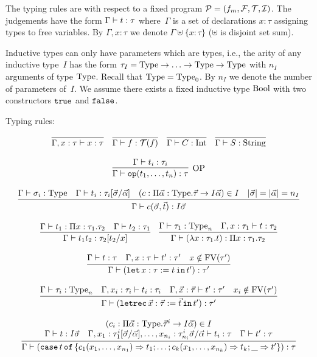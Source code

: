 \documentclass[final]{msc}
\begin{document}
The typing rules are with respect to a fixed \JuvixCore{} program $\mathcal{P} = (f_m, \mathcal{F}, \mathcal{T}, \mathcal{I})$. The judgements have the form $\Gamma \vdash t : \tau$ where~$\Gamma$ is a set of declarations $x : \tau$ assigning types to free variables. By $\Gamma, x : \tau$ we denote $\Gamma \uplus \{x : \tau\}$ ($\uplus$ is disjoint set sum).

Inductive types can only have parameters which are types, i.e., the arity of any inductive type~$I$ has the form $\tau_I = \mathrm{Type} \to \ldots \to \mathrm{Type} \to \mathrm{Type}$ with $n_I$ arguments of type $\mathrm{Type}$. Recall that $\mathrm{Type} = \mathrm{Type}_0$. By $n_I$ we denote the number of parameters of~$I$. We assume there exists a fixed inductive type $\mathrm{Bool}$ with two constructors $\mathtt{true}$ and $\mathtt{false}$.

Typing rules:

\[
\begin{array}{c}
\infer{\Gamma, x : \tau \proves x : \tau}{}\quad
\infer{\Gamma \proves f : \Tc(f)}{}\quad
\infer{\Gamma \proves C : \Int}{}\quad
\infer{\Gamma \proves S : \String}{}
\\ \\
\infer[\mathrm{OP}]{\Gamma \proves \op(t_1,\ldots,t_n) : \tau}{\Gamma \proves t_i : \tau_i}
\\ \\
\infer{\Gamma \proves c(\vec{\sigma},\vec{t}) : I \vec{\sigma}}{\Gamma \proves \sigma_i : \Type & \Gamma \proves t_i : \tau_i[\vec{\sigma}/\vec{\alpha}] & (c : \Pi \vec{\alpha} : \Type . \vec{\tau} \to I \vec{\alpha}) \in I & |\vec{\sigma}| = |\vec{\alpha}| = n_I}
\\ \\
\infer{\Gamma \proves t_1 t_2 : \tau_2[t_2/x]}{\Gamma \proves t_1 : \Pi x : \tau_1 . \tau_2 & \Gamma \proves t_2 : \tau_1}\quad
\infer{\Gamma \proves (\lambda x : \tau_1 . t) : \Pi x : \tau_1 . \tau_2}{\Gamma \proves \tau_1 : \Type_n & \Gamma, x : \tau_1 \proves t : \tau_2}
\\ \\
\infer{\Gamma \proves (\slet{x : \tau := t}{t'}) : \tau'}{\Gamma \proves t : \tau & \Gamma, x : \tau \proves t' : \tau' & x \notin \FV(\tau')}
\\ \\
\infer{\Gamma \proves (\sletrec{\vec{x} : \vec{\tau} := \vec{t}}{t'}) : \tau'}{\Gamma \proves \tau_i : \Type_n & \Gamma, x_i : \tau_i \proves t_i : \tau_i & \Gamma, \vec{x} : \vec{\tau} \proves t' : \tau' & x_i \notin \FV(\tau')}
\\ \\
\infer{\Gamma \proves (\scase{t}{\{c_1(x_1,\ldots,x_{n_1}) \To t_1; \ldots; c_k(x_1,\ldots,x_{n_k}) \To t_k; \_ \To t'\}}) : \tau}{\multicolumn{3}{c}{(c_i : \Pi \vec{\alpha} : \Type . \vec{\tau}^i \to I\vec{\alpha}) \in I}\\ \Gamma \proves t : I \vec{\sigma} & \Gamma, x_1 : \tau_1^i[\vec{\sigma}/\vec{\alpha}], \ldots, x_{n_i} : \tau_{n_i}^i\vec{\sigma}/\vec{\alpha} \proves t_i : \tau & \Gamma \proves t' : \tau}

\end{array}\]
\end{document}
